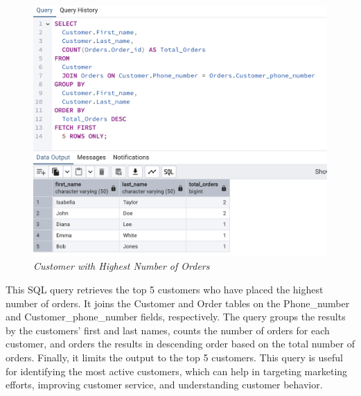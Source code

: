 \begin{figure}[H]
  \centering
  \includegraphics[width=1\textwidth]{images/sql/complex-queries/customer_with_highest_number_of_orders.png}
  \caption{\textit{Customer with Highest Number of Orders}}
\end{figure}

This SQL query retrieves the top 5 customers who have placed the highest number of orders. It joins the Customer and Order tables on the Phone\_number and Customer\_phone\_number fields, respectively. The query groups the results by the customers' first and last names, counts the number of orders for each customer, and orders the results in descending order based on the total number of orders. Finally, it limits the output to the top 5 customers. This query is useful for identifying the most active customers, which can help in targeting marketing efforts, improving customer service, and understanding customer behavior.




